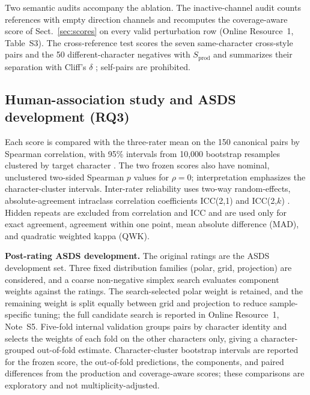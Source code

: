 Two semantic audits accompany the ablation. The inactive-channel audit
counts references with empty direction channels and recomputes the
coverage-aware score of Sect.~\ref{sec:scores} on every valid perturbation
row (Online Resource~1, Table~S3). The cross-reference test scores the seven
same-character cross-style pairs and the 50 different-character negatives
with \(S_{\mathrm{prod}}\) and summarizes their separation with Cliff's
\(\delta\) \cite{cliff1993dominance}; self-pairs are prohibited.

\subsection{Human-association study and ASDS development (RQ3)}
\label{sec:setup-human}

Each score is compared with the three-rater mean on the 150 canonical pairs
by Spearman correlation, with 95\% intervals from 10,000 bootstrap resamples
clustered by target character \cite{efron1993bootstrap}. The two frozen
scores also have nominal, unclustered two-sided Spearman \(p\) values for
\(\rho=0\); interpretation emphasizes the character-cluster intervals.
Inter-rater
reliability uses two-way random-effects, absolute-agreement intraclass
correlation coefficients ICC(2,1) and ICC(2,\(k\))
\cite{mcgraw1996icc,koo2016icc}. Hidden repeats are excluded from
correlation and ICC and are used only for exact agreement, agreement within
one point, mean absolute difference (MAD), and quadratic weighted kappa
(QWK).

\medskip
\noindent\textbf{Post-rating ASDS development.}
The original ratings are the ASDS development set. Three fixed distribution
families (polar, grid, projection) are considered, and a coarse non-negative
simplex search evaluates component weights against the ratings. The
search-selected polar weight is retained, and the remaining weight is split
equally between grid and projection to reduce sample-specific tuning; the full candidate search is reported in Online Resource~1, Note~S5. Five-fold
internal validation groups pairs by character identity and selects the
weights of each fold on the other characters only, giving a
character-grouped out-of-fold estimate. Character-cluster bootstrap intervals are reported for the frozen score,
the out-of-fold predictions, the components, and paired differences from
the production and coverage-aware scores; these comparisons are exploratory
and not multiplicity-adjusted.

